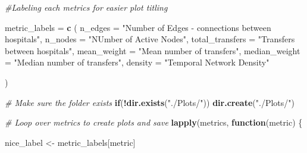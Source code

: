 \documentclass[
]{article}
\newenvironment{Shaded}{\begin{snugshade}}{\end{snugshade}}
\newcommand{\AttributeTok}[1]{\textcolor[rgb]{0.13,0.29,0.53}{#1}}
\newcommand{\CommentTok}[1]{\textcolor[rgb]{0.56,0.35,0.01}{\textit{#1}}}
\newcommand{\ControlFlowTok}[1]{\textcolor[rgb]{0.13,0.29,0.53}{\textbf{#1}}}
\newcommand{\FunctionTok}[1]{\textcolor[rgb]{0.13,0.29,0.53}{\textbf{#1}}}
\newcommand{\NormalTok}[1]{#1}
\newcommand{\OtherTok}[1]{\textcolor[rgb]{0.56,0.35,0.01}{#1}}
\newcommand{\SpecialCharTok}[1]{\textcolor[rgb]{0.81,0.36,0.00}{\textbf{#1}}}
\newcommand{\StringTok}[1]{\textcolor[rgb]{0.31,0.60,0.02}{#1}}
\begin{document}
\begin{Shaded}
\begin{Highlighting}[]
\CommentTok{\#Labeling each metrics for easier plot titling}

\NormalTok{metric\_labels }\OtherTok{=} \FunctionTok{c}\NormalTok{ (}
  \AttributeTok{n\_edges =} \StringTok{"Number of Edges {-} connections between hospitals"}\NormalTok{,}
  \AttributeTok{n\_nodes =} \StringTok{"NUmber of Active Nodes"}\NormalTok{,}
  \AttributeTok{total\_transfers =} \StringTok{"Transfers between hospitals"}\NormalTok{,}
  \AttributeTok{mean\_weight =} \StringTok{"Mean number of transfers"}\NormalTok{,}
  \AttributeTok{median\_weight =} \StringTok{"Median number of transfers"}\NormalTok{,}
  \AttributeTok{density =} \StringTok{"Temporal Network Density"}
  
\NormalTok{)}

\CommentTok{\# Make sure the folder exists}
\ControlFlowTok{if}\NormalTok{(}\SpecialCharTok{!}\FunctionTok{dir.exists}\NormalTok{(}\StringTok{"./Plots/"}\NormalTok{)) }\FunctionTok{dir.create}\NormalTok{(}\StringTok{"./Plots/"}\NormalTok{)}

\CommentTok{\# Loop over metrics to create plots and save}
\FunctionTok{lapply}\NormalTok{(metrics, }\ControlFlowTok{function}\NormalTok{(metric) \{}
  
\NormalTok{   nice\_label }\OtherTok{\textless{}{-}}\NormalTok{ metric\_labels[metric]}
   

\end{Highlighting}
\end{Shaded}
\end{document}

